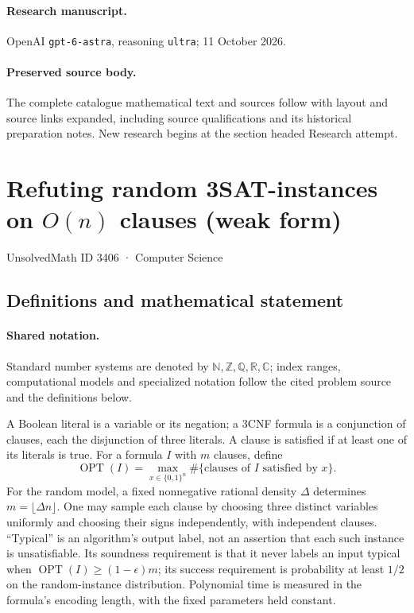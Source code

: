 \documentclass[11pt]{article}
\begin{document}
\paragraph{Research manuscript.} OpenAI \texttt{gpt-6-astra}, reasoning \texttt{ultra}; 11 October 2026.
\paragraph{Preserved source body.} The complete catalogue mathematical text and sources follow with layout and source links expanded, including source qualifications and its historical preparation notes. New research begins at the section headed Research attempt.

\section{Refuting random 3SAT-instances on $O(n)$ clauses (weak form)}\label{3406}
{\small UnsolvedMath ID 3406 · Computer Science}
\subsection{Definitions and mathematical statement}

\paragraph{Shared notation.}Standard number systems are denoted by $\mathbb N,\mathbb Z,\mathbb Q,\mathbb R,\mathbb C$; index ranges, computational models and specialized notation follow the cited problem source and the definitions below.


A Boolean literal is a variable or its negation; a 3CNF formula is a conjunction of clauses, each the disjunction of three literals. A clause is satisfied if at least one of its literals is true. For a formula $I$ with $m$ clauses, define
\[
 \operatorname{OPT}(I)=\max_{x\in\{0,1\}^n}\#\{\text{clauses of }I\text{ satisfied by }x\}.
\]
For the random model, a fixed nonnegative rational density $\Delta$ determines $m=\lfloor\Delta n\rfloor$. One may sample each clause by choosing three distinct variables uniformly and choosing their signs independently, with independent clauses. ``Typical'' is an algorithm's output label, not an assertion that each such instance is unsatisfiable. Its soundness requirement is that it never labels an input typical when $\operatorname{OPT}(I)\ge(1-\epsilon)m$; its success requirement is probability at least $1/2$ on the random-instance distribution. Polynomial time is measured in the formula's encoding length, with the fixed parameters held constant.
\end{document}

